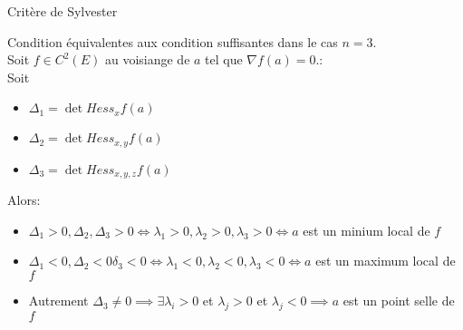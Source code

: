 \begin{parag}{Critère de Sylvester}
    \begin{theoreme}
    Condition équivalentes aux condition suffisantes dans le cas $n = 3$.\\
    Soit $f \in C^2\left(E\right)$ au voisiange de $a$ tel que $\nabla f\left(a\right) = 0$.:\\
    Soit 
    \begin{itemize}
        \item $\Delta_1 = \det Hess_x f\left(a\right)$
        \item $\Delta_2 = \det Hess_{x, y}f\left(a\right)$
        \item $\Delta_3 = \det Hess_{x, y, z} f\left(a\right)$
        
    \end{itemize}
    Alors:
    \begin{itemize}
        \item $\Delta_1 > 0, \Delta_2, \Delta_3 > 0 \iff \lambda_1 > 0, \lambda_2 > 0, \lambda_3 > 0 \iff a$  est un minium local de $f$
        \item $\Delta_1 <0, \Delta_2 < 0 \delta_3 < 0 \iff \lambda_1 < 0 , \lambda_2 <0, \lambda_3 < 0 \iff a$ est un maximum local de $f$
           \item Autrement $\Delta_3 \neq 0 \implies \exists \lambda_i > 0$ et $\lambda_j > 0$ et $\lambda_j < 0 \implies a$ est un point selle de $f$
    \end{itemize}
    \end{theoreme}
\end{parag}
